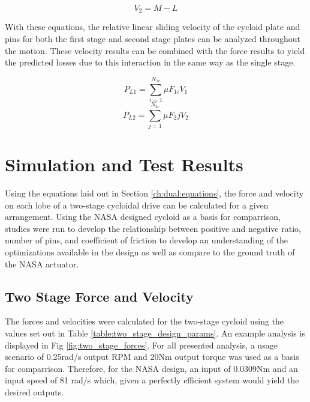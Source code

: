 \begin{equation}
V_{2} = M - L
\end{equation}

With these equations, the relative linear sliding velocity of the cycloid plate and pins for both the first stage and second stage plates can be analyzed throughout the motion. These velocity results can be combined with the force results to yield the predicted losses due to this interaction in the same way as the single stage.

\begin{equation} \label{eq:dual_power_loss_1}
P_{L1} = \sum_{i=1}^{N_{1c}}\mu F_{1i} V_1
\end{equation}
\begin{equation} \label{eq:dual_power_loss_2}
P_{L2} = \sum_{j=1}^{N_{2c}}\mu F_2j V_2
\end{equation}


\section{Simulation and Test Results} \label{ch:dual:test_results}

Using the equations laid out in Section \ref{ch:dual:equations}, the force and velocity on each lobe of a two-stage cycloidal drive can be calculated for a given arrangement. Using the NASA designed cycloid as a basis for comparrison, studies were run to develop the relationship between positive and negative ratio, number of pins, and coefficient of friction to develop an understanding of the optimizations available in the design as well as compare to the ground truth of the NASA actuator. 

\subsection{Two Stage Force and Velocity}\label{ch:dual:test_results:force_vel}

The forces and velocities were calculated for the two-stage cycloid using the values set out in Table \ref{table:two_stage_design_params}. An example analysis is displayed in Fig \ref{fig:two_stage_forces}. For all presented analysis, a usage scenario of 0.25rad/s output RPM and 20Nm output torque was used as a basis for comparrison. Therefore, for the NASA design, an input of 0.0309Nm and an input speed of 81 rad/s which, given a perfectly efficient system would yield the desired outputs. 

